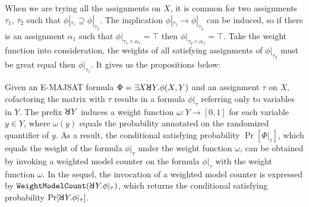     When we are trying all the assignments on $X$, it is common for two assignments $\tau_1$, $\tau_2$ such that $\phi|_{\tau_1} \supseteq \phi|_{\tau_2}$. The implication $\phi|_{\tau_1} \rightarrow \phi|_{\tau_2}$ can be induced, so if there is an assignment $\alpha_1$ such that $\phi|_{\tau_1 \wedge \alpha_1} = \top$ then $\phi|_{\tau_2 \wedge \alpha_1} = \top$. Take the weight function	into consideration, the weights of all satisfying assignments of $\phi|_{\tau_2}$ must be great equal then $\phi|_{\tau_1}$. It gives us the propositions below:

    Given an E-MAJSAT formula $\Phi=\exists X \random{} Y. \phi(X,Y)$ and an assignment $\tau$ on $X$, cofactoring the matrix with $\tau$ results in a formula $\phi|_{\tau}$ referring only to variables in $Y$.
    The prefix $\random{} Y$ induces a weight function $\omega: Y \rightarrow [0,1]$ for each variable $y \in Y$, where $\omega(y)$ equals the probability annotated on the randomized quantifier of $y$.
    As a result, the conditional satisfying probability $\Pr[\Phi|_{\tau}]$, which equals the weight of the formula $\phi|_{\tau}$ under the weight function $\omega$, can be obtained by invoking a weighted model counter on the formula $\phi|_{\tau}$ with the weight function $\omega$.
    In the sequel, the invocation of a weighted model counter is expressed by $\mathtt{WeightModelCount}(\random{} Y. \phi|_{\tau})$, which returns the conditional satisfying probability $\Pr[\random{} Y. \phi|_{\tau}]$.
\fi